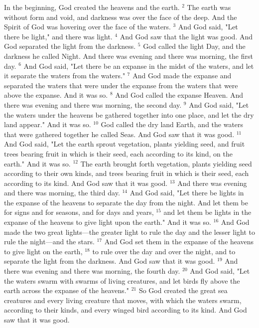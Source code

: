 In the beginning, God created the heavens and the earth.
$^{2}$ The earth was without form and void, and darkness was over the face of the deep. And the Spirit of God was hovering over the face of the waters.
$^{3}$ And God said, "Let there be light," and there was light.
$^{4}$ And God saw that the light was good. And God separated the light from the darkness.
$^{5}$ God called the light Day, and the darkness he called Night. And there was evening and there was morning, the first day.
$^{6}$ And God said, "Let there be an expanse in the midst of the waters, and let it separate the waters from the waters."
$^{7}$ And God made the expanse and separated the waters that were under the expanse from the waters that were above the expanse. And it was so.
$^{8}$ And God called the expanse Heaven. And there was evening and there was morning, the second day.
$^{9}$ And God said, "Let the waters under the heavens be gathered together into one place, and let the dry land appear." And it was so.
$^{10}$ God called the dry land Earth, and the waters that were gathered together he called Seas. And God saw that it was good.
$^{11}$ And God said, "Let the earth sprout vegetation, plants yielding seed, and fruit trees bearing fruit in which is their seed, each according to its kind, on the earth." And it was so.
$^{12}$ The earth brought forth vegetation, plants yielding seed according to their own kinds, and trees bearing fruit in which is their seed, each according to its kind. And God saw that it was good.
$^{13}$ And there was evening and there was morning, the third day.
$^{14}$ And God said, "Let there be lights in the expanse of the heavens to separate the day from the night. And let them be for signs and for seasons, and for days and years,
$^{15}$ and let them be lights in the expanse of the heavens to give light upon the earth." And it was so.
$^{16}$ And God made the two great lights—the greater light to rule the day and the lesser light to rule the night—and the stars.
$^{17}$ And God set them in the expanse of the heavens to give light on the earth,
$^{18}$ to rule over the day and over the night, and to separate the light from the darkness. And God saw that it was good.
$^{19}$ And there was evening and there was morning, the fourth day.
$^{20}$ And God said, "Let the waters swarm with swarms of living creatures, and let birds fly above the earth across the expanse of the heavens."
$^{21}$ So God created the great sea creatures and every living creature that moves, with which the waters swarm, according to their kinds, and every winged bird according to its kind. And God saw that it was good.
